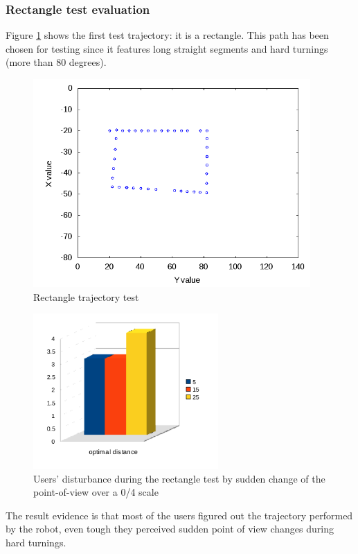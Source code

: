 \subsubsection{Rectangle test evaluation}
\label{subsubsec:rectangletest}
Figure \ref{fig:rectangletest} shows the first test trajectory:
it is a rectangle. This path has been chosen for testing since it
features long straight segments and hard turnings (more than 80
degrees).
%
\begin{figure}[!h]
  \begin{center}
    \includegraphics[width=300pt]{img/path_session_9.png}
    \caption{Rectangle trajectory test} 
    \label{fig:rectangletest}
  \end{center}
\end{figure}
%
\begin{figure}[!h]
  \begin{center}
    \includegraphics[width=200pt]{img/square.png}
    \caption{Users' disturbance during the rectangle test 
      by sudden change of the point-of-view over a 0/4 scale}
  \end{center}
\end{figure}
%
The result evidence is that most of the users figured out the
trajectory performed by the robot, even tough they perceived
sudden point of view changes during hard turnings.
%

